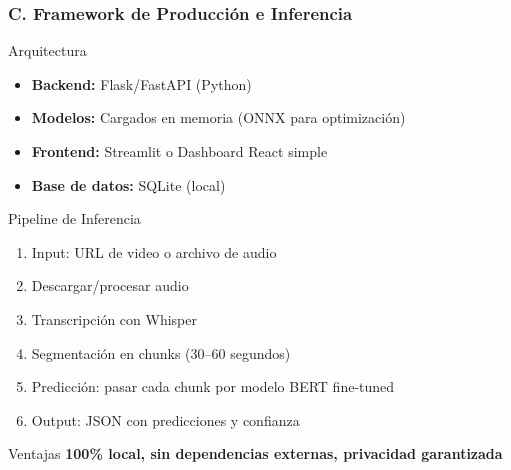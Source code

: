 \documentclass[aspectratio=169,10pt]{beamer}
\begin{document}
\begin{frame}
  \frametitle{C. Framework de Producción e Inferencia}
  
  \begin{block}{Arquitectura}
    \begin{itemize}
      \item \textbf{Backend:} Flask/FastAPI (Python)
      \item \textbf{Modelos:} Cargados en memoria (ONNX para optimización)
      \item \textbf{Frontend:} Streamlit o Dashboard React simple
      \item \textbf{Base de datos:} SQLite (local)
    \end{itemize}
  \end{block}

  \begin{block}{Pipeline de Inferencia}
    \begin{enumerate}
      \item Input: URL de video o archivo de audio
      \item Descargar/procesar audio
      \item Transcripción con Whisper
      \item Segmentación en chunks (30--60 segundos)
      \item Predicción: pasar cada chunk por modelo BERT fine-tuned
      \item Output: JSON con predicciones y confianza
    \end{enumerate}
  \end{block}

  \begin{block}{Ventajas}
    \textbf{100\% local, sin dependencias externas, privacidad garantizada}
  \end{block}
\end{frame}
\end{document}
